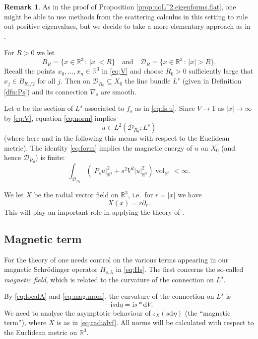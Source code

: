 \documentclass{article}
\theoremstyle{definition}
\newtheorem{rmk}[thm]{Remark}
\numberwithin{thm}{section}
\numberwithin{equation}{section}
\DeclareMathOperator\vol{vol}
\def\R{\mathbb{R}}
\newcommand{\ii}{\mathrm i}
\newcommand{\dd}{\mathrm d}
\begin{document}
\begin{rmk}
    As in the proof of Proposition \ref{prop:noL^2.eigenforms.flat}, one might be able to use methods from the scattering calculus in this setting to rule out positive eigenvalues, but we decide to take a more elementary approach as in \cite{AHK}.
\end{rmk}
 
For $R>0$ we let 
\begin{equation}\label{eq:DR}
    B_R=\{x\in\R^3\,:\,|x|<R\} \quad\text{and}\quad \mathcal{D}_R =\{x\in\R^3\,:\,|x|> R\}.
\end{equation}
Recall the points $x_0,\ldots,x_n\in\R^3$ in \eqref{eq:V} and choose $R_0>0$ sufficiently large that $x_j\in B_{R_0/2}$ for all $j$.  Then on $\mathcal{D}_{R_0}\subseteq X_0$ the line bundle $L^s$ (given in Definition \ref{dfn:Ps}) and its connection $\nabla_s$ are smooth.   

Let $u$ be the section of $L^s$ associated to $f_s$ as in \eqref{eq:fs.u}. Since $V\to1$ as $|x|\to \infty$ by \eqref{eq:V}, equation \eqref{eq:norm} implies 
\begin{equation} u\in L^2(\mathcal{D}_{R_0};L^s)
\end{equation}
(where here and in the following this means with respect to the Euclidean metric). The identity \eqref{eq:form} implies the magnetic energy of $u$ on $X_0$ (and hence $\mathcal{D}_{R_0}$) is finite:
\begin{equation}\label{eq:mag.finite}
    \int_{\mathcal{D}_{R_0}}(|P_su|^2_{\R^3}+s^2V^2|u|_{\R^3}^2)\vol_{\R^3}<\infty.
\end{equation}

We let $X$ be the radial vector field on $\R^3$, i.e.~for $r=|x|$ we have
\begin{equation}\label{eq:radialvf}
    X(x)=r\partial_r.
\end{equation}
This will play an important role in applying the theory of \cite{AHK}.

\subsection{Magnetic term}

For the theory of \cite{AHK} one needs control on the various terms appearing in our magnetic Schr\"odinger operator $H_{s,\lambda}$ in \eqref{eq:Hs}.  The first concerns the so-called \emph{magnetic field}, which is related to the curvature of the connection on $L^s$.

By \eqref{eq:localA} and \eqref{eq:mag.mom}, the curvature of the connection on $L^s$ is 
\begin{equation}
    -\ii s\dd\eta=\ii s*\dd V.
\end{equation}  We  need to analyse the asymptotic behaviour of $\iota_X(s\dd\eta)$ (the ``magnetic term''), where $X$ is as in \eqref{eq:radialvf}. All norms will be calculated with respect to the Euclidean metric on $\R^3$.  
\end{document}
